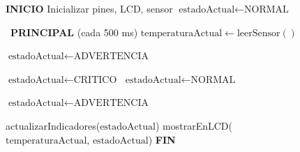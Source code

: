 

\begin{algorithm}[t]
\caption{Control de Temperatura con Histéresis}
\label{alg:control_temp}
\begin{algorithmic}[1]

\Statex \textbf{INICIO}
\State Inicializar pines, LCD, sensor
\State $\text{estadoActual} \gets \text{NORMAL}$

\Loop \ \textbf{PRINCIPAL} (cada 500 ms)
    \State $\text{temperaturaActual} \gets \text{leerSensor}()$
    
            \State $\text{estadoActual} \gets \text{ADVERTENCIA}$
        \EndIf

            \State $\text{estadoActual} \gets \text{CRITICO}$
            \State $\text{estadoActual} \gets \text{NORMAL}$
        \EndIf

            \State $\text{estadoActual} \gets \text{ADVERTENCIA}$
        \EndIf
    \EndIf

    \State actualizarIndicadores($\text{estadoActual}$)
    \State mostrarEnLCD($\text{temperaturaActual, estadoActual}$)
\EndLoop
\Statex \textbf{FIN}

\end{algorithmic}
\end{algorithm}